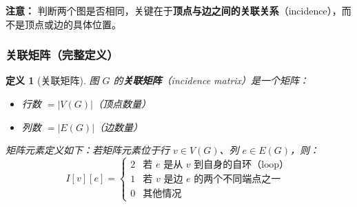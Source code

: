 \documentclass[12pt, a4paper]{article}
\newtheorem{definition}{定义}[section]
\begin{document}
\textbf{注意：} 判断两个图是否相同，关键在于\textbf{顶点与边之间的关联关系}（incidence），而不是顶点或边的具体位置。


\subsubsection{关联矩阵（完整定义）}

\begin{definition}[关联矩阵]
图 $G$ 的\textbf{关联矩阵}（incidence matrix）是一个矩阵：
\begin{itemize}
    \item 行数 $= |V(G)|$（顶点数量）
    \item 列数 $= |E(G)|$（边数量）
\end{itemize}

矩阵元素定义如下：若矩阵元素位于行 $v \in V(G)$、列 $e \in E(G)$，则：
\[
I[v][e] = \begin{cases}
2 & \text{若 } e \text{ 是从 } v \text{ 到自身的自环（loop）} \\
1 & \text{若 } v \text{ 是边 } e \text{ 的两个不同端点之一} \\
0 & \text{其他情况}
\end{cases}
\]
\end{definition}
\end{document}
